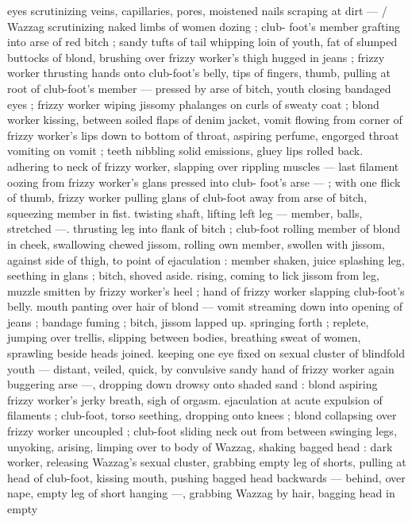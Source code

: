 eyes scrutinizing veins, capillaries, pores, moistened nails scraping 
at dirt --- {\slash} Wazzag scrutinizing naked limbs of women dozing ; club- 
foot's member grafting into arse of red bitch ; sandy tufts of tail 
whipping loin of youth, fat of slumped buttocks of blond, brushing 
over frizzy worker's thigh hugged in jeans ; frizzy worker thrusting 
hands onto club-foot's belly, tips of fingers, thumb, pulling at root of 
club-foot's member --- pressed by arse of bitch, youth closing 
bandaged eyes ; frizzy worker wiping jissomy phalanges on curls of 
sweaty coat ; blond worker kissing, between soiled flaps of denim 
jacket, vomit flowing from corner of frizzy worker's lips down to 
bottom of throat, aspiring perfume, engorged throat vomiting on 
vomit ; teeth nibbling solid emissions, gluey lips rolled back. 
adhering to neck of frizzy worker, slapping over rippling muscles --- 
last filament oozing from frizzy worker's glans pressed into club- 
foot's arse --- ; with one flick of thumb, frizzy worker pulling glans 
of club-foot away from arse of bitch, squeezing member in fist. 
twisting shaft, lifting left leg --- member, balls, stretched ---. 
thrusting leg into flank of bitch ; club-foot rolling member of blond 
in cheek, swallowing chewed jissom, rolling own member, swollen 
with jissom, against side of thigh, to point of ejaculation : member 
shaken, juice splashing leg, seething in glans ; bitch, shoved aside. 
rising, coming to lick jissom from leg, muzzle smitten by frizzy 
worker's heel ; hand of frizzy worker slapping club-foot's belly. 
mouth panting over hair of blond --- vomit streaming down into 
opening of jeans ; bandage fuming ; bitch, jissom lapped up. 
springing forth ; replete, jumping over trellis, slipping between 
bodies, breathing sweat of women, sprawling beside heads joined. 
keeping one eye fixed on sexual cluster of blindfold youth --- 
distant, veiled, quick, by convulsive sandy hand of frizzy worker 
again buggering arse ---, dropping down drowsy onto shaded sand : 
blond aspiring frizzy worker's jerky breath, sigh of orgasm. 
ejaculation at acute expulsion of filaments ; club-foot, torso 
seething, dropping onto knees ; blond collapsing over frizzy worker 
uncoupled ; club-foot sliding neck out from between swinging legs, 
unyoking, arising, limping over to body of Wazzag, shaking bagged 
head : dark worker, releasing Wazzag's sexual cluster, grabbing 
empty leg of shorts, pulling at head of club-foot, kissing mouth, 
pushing bagged head backwards --- behind, over nape, empty leg of 
short hanging ---, grabbing Wazzag by hair, bagging head in empty 
